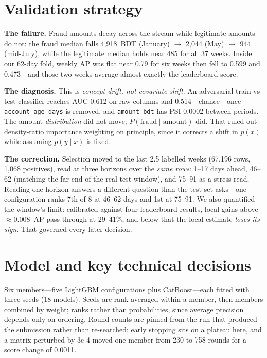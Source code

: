 \documentclass[10pt,a4paper]{article}
\begin{document}
\section{Validation strategy}

\textbf{The failure.} Fraud amounts decay across the stream while legitimate
amounts do not: the fraud median falls 4{,}918~BDT (January) $\rightarrow$ 2{,}044
(May) $\rightarrow$ 944 (mid-July), while the legitimate median holds near 485
for all 37 weeks. Inside our 62-day fold, weekly AP was flat near 0.79 for six
weeks then fell to 0.599 and 0.473---and those two weeks average almost exactly
the leaderboard score.

\textbf{The diagnosis.} This is \emph{concept drift, not covariate shift}. An
adversarial train-vs-test classifier reaches AUC 0.612 on raw columns and
0.514---chance---once \texttt{account\_age\_days} is removed, and
\texttt{amount\_bdt} has PSI 0.0002 between periods. The amount \emph{distribution}
did not move; $P(\text{fraud}\mid\text{amount})$ did. That ruled out
density-ratio importance weighting on principle, since it corrects a shift in
$p(x)$ while assuming $p(y\mid x)$ is fixed.

\textbf{The correction.} Selection moved to the last 2.5 labelled weeks
(67{,}196 rows, 1{,}068 positives), read at three horizons over the \emph{same
rows}: 1--17 days ahead, 46--62 (matching the far end of the real test window),
and 75--91 as a stress read. Reading one horizon answers a different question
than the test set asks---one configuration ranks 7th of 8 at 46--62 days and 1st
at 75--91. We also quantified the window's limit: calibrated against four
leaderboard results, local gains above ${\approx}0.008$~AP pass through at
29--41\%, and below that the local estimate \emph{loses its sign}. That governed
every later decision.

\section{Model and key technical decisions}

Six members---five LightGBM configurations plus CatBoost---each fitted with three
seeds (18 models). Seeds are rank-averaged within a member, then members combined
by weight; ranks rather than probabilities, since average precision depends only
on ordering. Round counts are pinned from the run that produced the submission
rather than re-searched: early stopping sits on a plateau here, and a matrix
perturbed by 3e-4 moved one member from 230 to 758 rounds for a score change of
0.0011.
\end{document}
